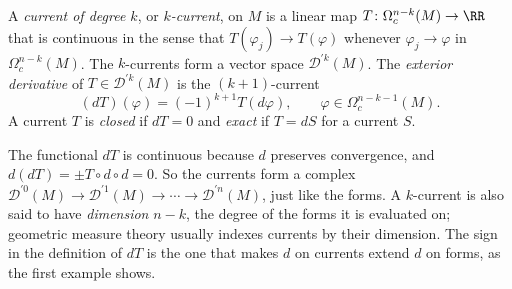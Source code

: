 \begin{definition}\label{currents:definition-current-manifold}
A \emph{current of degree $k$}, or \emph{$k$-current}, on $M$ is a linear map $T \colon \Omega^{n-k}_c(M) \to \RR$ that is continuous in the sense that $T(\varphi_j) \to T(\varphi)$ whenever
$\varphi_j \to \varphi$ in $\Omega^{n-k}_c(M)$. The $k$-currents form a vector space $\mathcal{D}^{\prime k}(M)$. The \emph{exterior derivative} of $T \in \mathcal{D}^{\prime k}(M)$ is the
$(k+1)$-current
\[
(dT)(\varphi) = (-1)^{k+1}T(d\varphi), \qquad \varphi \in \Omega^{n-k-1}_c(M).
\]
A current $T$ is \emph{closed} if $dT = 0$ and \emph{exact} if $T = dS$ for a current $S$.
\end{definition}

The functional $dT$ is continuous because $d$ preserves convergence, and $d(dT) = \pm T \circ d \circ d = 0$. So the currents form a complex
$\mathcal{D}^{\prime 0}(M) \to \mathcal{D}^{\prime 1}(M) \to \cdots \to \mathcal{D}^{\prime n}(M)$, just like the forms. A $k$-current is also said to have \emph{dimension} $n - k$, the degree of the forms
it is evaluated on; geometric measure theory usually indexes currents by their dimension. The sign in the definition of $dT$ is the one that makes $d$ on currents extend $d$ on forms, as
the first example shows.

